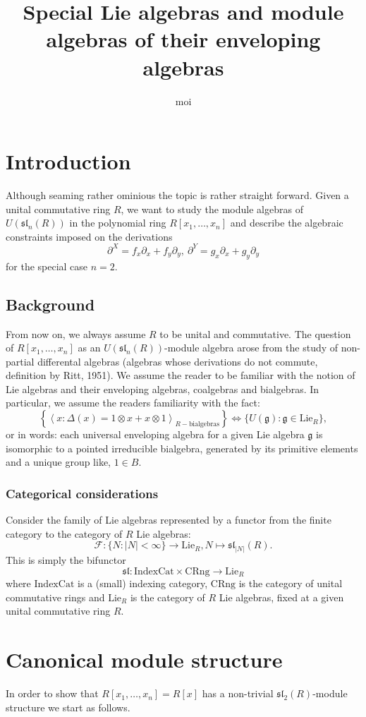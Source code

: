 \documentclass[10pt,a4paper]{article}
\author{moi}
\title{Special Lie algebras and module algebras of their enveloping algebras}
\begin{document}
\section{Introduction}
Although seaming rather ominious the topic is rather straight forward. Given a unital commutative ring $R$, we want to study the module algebras of $U(\mathfrak{sl}_n(R))$ in the polynomial ring $R[x_1,\ldots,x_n]$ and describe the algebraic constraints imposed on the derivations
$$\partial^X = f_x \partial_x + f_y \partial_y,\ \partial^Y = g_x \partial_x + g_y \partial_y$$
for the special case $n = 2$.
\subsection{Background}
From now on, we always assume $R$ to be unital and commutative. The question of $R[x_1,\ldots,x_n]$ as an $U(\mathfrak{sl}_n(R))$-module algebra arose from the study of non-partial differental algebras (algebras whose derivations do not commute, definition by Ritt, 1951). We assume the reader to be familiar with the notion of Lie algebras and their enveloping algebras, coalgebras and bialgebras. In particular, we assume the readers familiarity with the fact:
$$\left\{\left<x : \Delta(x) = 1 \otimes x + x \otimes 1\right>_{R-\mathrm{bialgebras}}\right\} \Leftrightarrow \{U(\mathfrak{g}) : \mathfrak{g} \in \mathrm{Lie}_R\},$$
or in words: each universal enveloping algebra for a given Lie algebra $\mathfrak{g}$ is isomorphic to a pointed irreducible bialgebra, generated by its primitive elements and a unique group like, $1 \in B$.
\subsubsection{Categorical considerations}
Consider the family of Lie algebras represented by a functor from the finite category to the category of $R$ Lie algebras:
$$\mathcal{F} : \{N : |N| < \infty\} \longrightarrow \mathrm{Lie}_R, N \longmapsto \mathfrak{sl}_{|N|}(R).$$
This is simply the bifunctor
$$\mathfrak{sl} : \mathrm{IndexCat} \times \mathrm{CRng} \longrightarrow \mathrm{Lie}_R$$ where $\mathrm{IndexCat}$ is a (small) indexing category, $\mathrm{CRng}$ is the category of unital commutative rings and $\mathrm{Lie}_R$ is the category of $R$ Lie algebras, fixed at a given unital commutative ring $R$.
\newpage
\section{Canonical module structure}
In order to show that $R[x_1,\ldots,x_n] = R[x]$ has a non-trivial $\mathfrak{sl}_2(R)$-module structure we start as follows.
\end{document}
